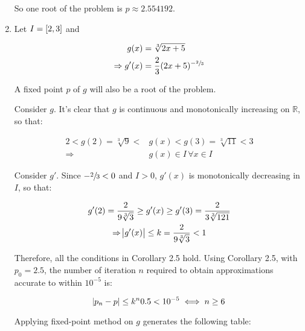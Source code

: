 \documentclass[../../../../Assignments]{subfiles}
\begin{document}
\begin{solution}
\begin{enumerate}[label = \alph*)]
            So one root of the problem is \(p \approx \num{2.554192}\).

        \item Let \(I = \interval{2}{3}\) and

            \[\begin{aligned}
                             g(x) &= \sqrt[3]{2x + 5} \\
                \Rightarrow g'(x) &= \dfrac{2}{3} (2x + 5)^{- \sfrac{2}{3}}
            \end{aligned}\]

            A fixed point \(p\) of \(g\) will also be a root of the problem.

            Consider \(g\). It's clear that \(g\) is continuous and
            monotonically increasing on \(\mathbb{R}\), so that:

            \begin{align*}
                2 < g(2) = \sqrt[3]{9} < &g(x) < g(3) = \sqrt[3]{11} < 3 \\
                             \Rightarrow &g(x) \in I \, \forall x \in I
            \end{align*}

            Consider \(g'\). Since \(- \sfrac{2}{3} < 0\) and \(I > 0\),
            \(g'(x)\) is monotonically decreasing in \(I\), so that:

            \begin{gather*}
                g'(2) = \frac{2}{9 \sqrt[3]{3}} \geq g'(x) \geq g'(3) = \frac{2}{3 \sqrt[3]{121}} \\
                \Rightarrow \abs{g'(x)} \leq k = \frac{2}{9 \sqrt[3]{3}} < 1
            \end{gather*}

            Therefore, all the conditions in Corollary 2.5 hold. Using Corollary
            2.5, with \(p_0 = \num{2.5}\), the number of iteration \(n\)
            required to obtain approximations accurate to within \(10^{-5}\) is:

            \[\abs{p_n - p} \leq k^n \num{0.5} < 10^{-5} \iff n \geq 6\]

            Applying fixed-point method on \(g\) generates the following table:


\end{enumerate}
\end{solution}
\end{document}
